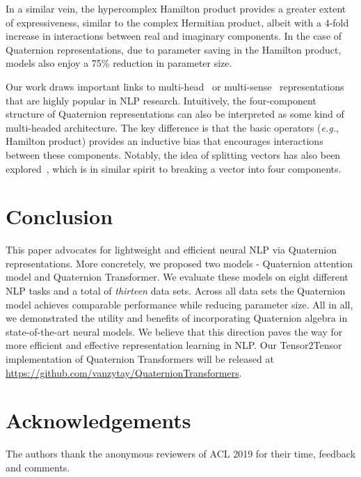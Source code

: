 \documentclass[11pt,a4paper]{article}
\begin{document}
 In a similar vein, the hypercomplex Hamilton product provides a greater extent of expressiveness, similar to the complex Hermitian product, albeit with a 4-fold increase in interactions between real and imaginary components. In the case of Quaternion representations, due to parameter saving in the Hamilton product, models also enjoy a 75\% reduction in parameter size.

 Our work draws important links to multi-head~\cite{vaswani2017attention} or multi-sense~\cite{li2015multi,neelakantan2015efficient} representations that are highly popular in NLP research. Intuitively, the four-component structure of Quaternion representations can also be interpreted as some kind of multi-headed architecture. The key difference is that the basic operators (\emph{e.g.}, Hamilton product) provides an inductive bias that encourages interactions between these components. Notably, the idea of splitting vectors has also been explored~\cite{daniluk2017frustratingly}, which is in similar spirit to breaking a vector into four components.


\section{Conclusion}
This paper advocates for lightweight and efficient neural NLP via Quaternion representations. More concretely, we proposed two models - Quaternion attention model and Quaternion Transformer. We evaluate these models on eight different NLP tasks and a total of \textit{thirteen} data sets. Across all data sets the Quaternion model achieves comparable performance while reducing parameter size. All in all, we demonstrated the utility and benefits of incorporating Quaternion algebra in state-of-the-art neural models. We believe that this direction paves the way for more efficient and effective representation learning in NLP. Our Tensor2Tensor implementation of Quaternion Transformers will be released at \url{https://github.com/vanzytay/QuaternionTransformers}.

\section{Acknowledgements}
The authors thank the anonymous reviewers of ACL 2019 for their time, feedback and comments.


%
%


\end{document}
